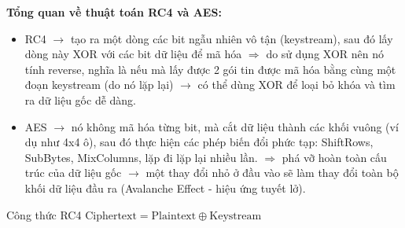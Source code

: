 \noindent
\textbf{Tổng quan về thuật toán RC4 và AES:}

\begin{itemize}
    \item RC4 $\rightarrow$ tạo ra một dòng các bit ngẫu nhiên vô tận (keystream), sau đó lấy dòng này XOR với các bit dữ liệu để mã hóa $\Rightarrow$ do sử dụng XOR nên nó tính reverse, nghĩa là nếu mà lấy được 2 gói tin được mã hóa bằng cùng một đoạn keystream (do nó lặp lại) $\rightarrow$ có thể dùng XOR để loại bỏ khóa và tìm ra dữ liệu gốc dễ dàng.
    \item AES $\rightarrow$ nó không mã hóa từng bit, mà cắt dữ liệu thành các khối vuông (ví dụ như 4x4 ô), sau đó thực hiện các phép biến đổi phức tạp: ShiftRows, SubBytes, MixColumns, lặp đi lặp lại nhiều lần. $\Rightarrow$ phá vỡ hoàn toàn cấu trúc của dữ liệu gốc $\rightarrow$ một thay đổi nhỏ ở đầu vào sẽ làm thay đổi toàn bộ khối dữ liệu đầu ra (Avalanche Effect - hiệu ứng tuyết lở).
\end{itemize}

\begin{mybox}{Công thức RC4}
$\text{Ciphertext} = \text{Plaintext} \oplus \text{Keystream}$
\end{mybox}
